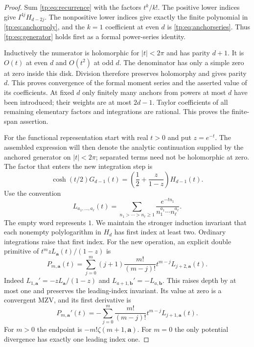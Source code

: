 \documentclass[11pt,a4paper]{article}
\numberwithin{equation}{section}
\theoremstyle{definition}
\theoremstyle{remark}
\begin{document}
\begin{proof}
Sum \eqref{tp:eq:recurrence} with the factors $t^k/k!$.  The positive
lower indices give $I^{4j}H_{d-2j}$.  The nonpositive lower indices
give exactly the finite polynomial in \eqref{tp:eq:anchorpoly}, and
the $k=1$ coefficient at even $d$ is \eqref{tp:eq:anchorseries}.  Thus
\eqref{tp:eq:generator} holds first as a formal power-series identity.

Inductively the numerator is holomorphic for $|t|<2\pi$ and has
parity $d+1$.  It is $O(t)$ at even $d$ and $O(t^2)$ at odd $d$.
The denominator has only a simple zero at zero inside this disk.
Division therefore preserves holomorphy and gives parity $d$.
This proves convergence of the formal moment series and the asserted
value of its coefficients.  At fixed $d$ only finitely many anchors
from powers at most $d$ have been introduced; their weights are at
most $2d-1$.  Taylor coefficients of all remaining elementary factors
and integrations are rational.  This proves the finite-span assertion.

For the functional representation start with real $t>0$ and put
$z=e^{-t}$. The assembled expression will then denote the analytic
continuation supplied by the anchored generator on $|t|<2\pi$;
separated terms need not be holomorphic at zero. The factor that
enters the new integration step is
\[
 \cosh(t/2)G_{d-1}(t)
 =\left(\frac12+\frac z{1-z}\right)H_{d-1}(t).
\]
Use the convention
\[
 L_{a_1,\ldots,a_\ell}(t)
 =\sum_{n_1>\cdots>n_\ell\geq1}
       \frac{e^{-tn_1}}{n_1^{a_1}\cdots n_\ell^{a_\ell}}.
\]
The empty word represents $1$. We maintain the stronger induction
invariant that each nonempty polylogarithm in $H_d$ has first index at
least two. Ordinary integrations raise that first index. For the new
operation, an explicit double primitive of
$t^m zL_{\boldsymbol a}(t)/(1-z)$ is
\[
 P_{m,\boldsymbol a}(t)=\sum_{j=0}^m(j+1)\frac{m!}{(m-j)!}
                t^{m-j}L_{j+2,\boldsymbol a}(t).
\]
Indeed $L_{1,\boldsymbol a}'=-zL_{\boldsymbol a}/(1-z)$ and
$L_{a+1,\boldsymbol b}'=-L_{a,\boldsymbol b}$. This raises depth by
at most one and preserves the leading-index invariant. Its value at
zero is a convergent MZV, and its first derivative is
\[
 P_{m,\boldsymbol a}'(t)=-\sum_{j=0}^m\frac{m!}{(m-j)!}
                t^{m-j}L_{j+1,\boldsymbol a}(t).
\]
For $m>0$ the endpoint is $-m!\zeta(m+1,\boldsymbol a)$. For $m=0$
the only potential divergence has exactly one leading index one.


\end{proof}
\end{document}
